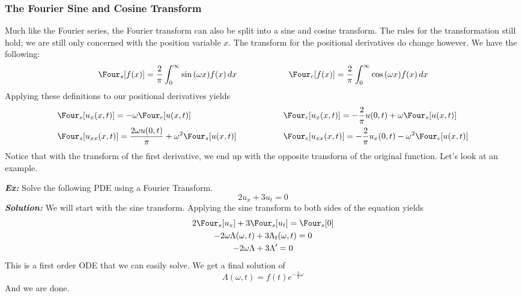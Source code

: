 \subsubsection{The Fourier Sine and Cosine Transform}
Much like the Fourier series, the Fourier transform can also be split into a sine and cosine
transform. The rules for the transformation still hold; we are still only concerned with the
position variable $x$. The transform for the positional derivatives do change however. We have
the following:
\[
\Four_{s}[f(x)] = \frac{2}{\pi}\int_{0}^{\infty}\sin{(\omega x)}f(x)\mathop{dx}
\qquad\qquad\qquad
\Four_{c}[f(x)] = \frac{2}{\pi}\int_{0}^{\infty}\cos{(\omega x)}f(x)\mathop{dx}
\]
Applying these definitions to our positional derivatives yields
\begin{alignat*}{3}
&\Four_{s}[u_{x}(x,t)] = -\omega\Four_{c}[u(x,t)] \qquad\qquad\qquad\qquad\qquad
&&\Four_{c}[u_{x}(x,t)] = -\frac{2}{\pi}u(0,t)+\omega\Four_{s}[u(x,t)]\\
&\Four_{s}[u_{xx}(x,t)] = \frac{2\omega u(0,t)}{\pi} + \omega^{2}\Four_{s}[u(x,t)]
&&\Four_{c}[u_{xx}(x,t)] = -\frac{2}{\pi}u_{x}(0,t)-\omega^{2}\Four_{c}[u(x,t)]
\end{alignat*}
Notice that with the transform of the first derivative, we end up with the opposite transform of the
original function. Let's look at an example.

\noindent \textbf{\textit{Ex:}} Solve the following PDE using a Fourier Transform.
\[
2u_{x} + 3u_{t} = 0
\]
\indent \textbf{\textit{Solution:}} We will start with the sine transform. Applying the sine transform to
both sides of the equation yields
\begin{gather*}
2\Four_{s}[u_{x}] + 3\Four_{s}[u_{t}] = \Four_{s}[0]\\
-2\omega\Lambda(\omega,t) + 3\Lambda_{t}(\omega,t) = 0\\
-2\omega\Lambda + 3\Lambda' = 0
\end{gather*}
This is a first order ODE that we can easily solve. We get a final solution of
\[
\Lambda(\omega,t) = f(t)e^{-\frac{2}{3}\omega}
\]
And we are done.
